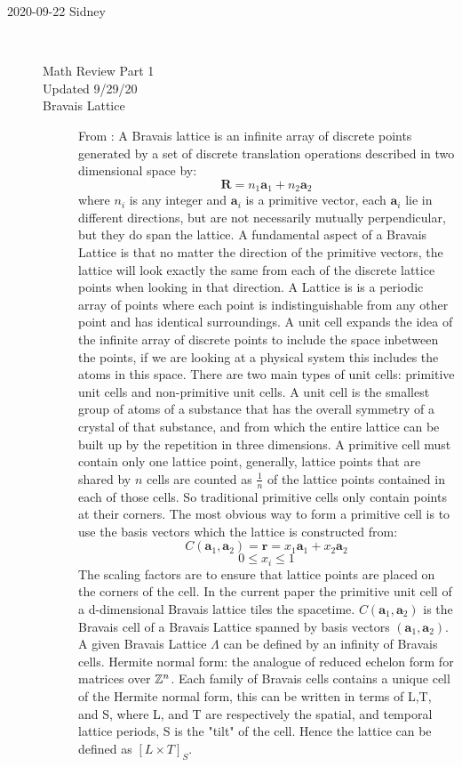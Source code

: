 \begin{description}
\item[2020-09-22 Sidney]~~
\begin{description}
\item[Math Review Part 1]
\item[Updated 9/29/20]
\item[Bravais Lattice]

From :
A Bravais lattice is an infinite array of discrete points generated by a
set of discrete translation operations described in two dimensional space
by:
$$\mathbf{R}=n_1\mathbf{a}_1+n_2\mathbf{a}_2$$
where $n_i$ is any integer and $\mathbf{a}_i$ is a primitive vector, each
$\mathbf{a}_i$ lie in different directions, but are not necessarily
mutually perpendicular, but they do span the lattice. A fundamental
aspect of a Bravais Lattice is that no matter the direction of the
primitive vectors, the lattice will look exactly the same from each of
the discrete lattice points when looking in that direction. A Lattice is
is a periodic array of points where each point is indistinguishable from
any other point and has identical surroundings. A unit cell expands the
idea of the infinite array of discrete points to include the space
inbetween the points, if we are looking at a physical system this
includes the atoms in this space. There are two main types of unit cells:
primitive unit cells and non-primitive unit cells. A unit cell is the
smallest group of atoms of a substance that has the overall symmetry of a
crystal of that substance, and from which the entire lattice can be built
up by the repetition in three dimensions. A primitive cell must contain
only one lattice point, generally, lattice points that are shared by $n$
cells are counted as $\frac{1}{n}$ of the lattice points contained in
each of those cells. So traditional primitive cells only contain points
at their corners. The most obvious way to form a primitive cell is to use
the basis vectors which the lattice is constructed from:
$$C(\mathbf{a}_1,\mathbf{a}_2)=\mathbf{r}=x_1\mathbf{a}_1+x_2\mathbf{a}_2$$
$$0\leq x_i\leq 1$$
The scaling factors are to ensure that lattice points are placed on the
corners of the cell. In the current paper the primitive unit cell of a
d-dimensional Bravais lattice tiles the spacetime.
$C(\mathbf{a}_1,\mathbf{a}_2)$ is the Bravais cell of a Bravais Lattice
spanned by basis vectors $(\mathbf{a}_1,\mathbf{a}_2)$. A given Bravais
Lattice $\Lambda$ can be defined by an infinity of Bravais cells. Hermite
normal form: the analogue of reduced echelon form for matrices over
$\mathbb{Z}^n$. Each family of Bravais cells contains a unique cell of the
Hermite normal form, this can be written in terms of L,T, and S, where L,
and T are respectively the spatial, and temporal lattice periods, S is
the "tilt" of the cell. Hence the lattice can be defined as $[L\times
T]_S$.


\end{description}
\end{description}
